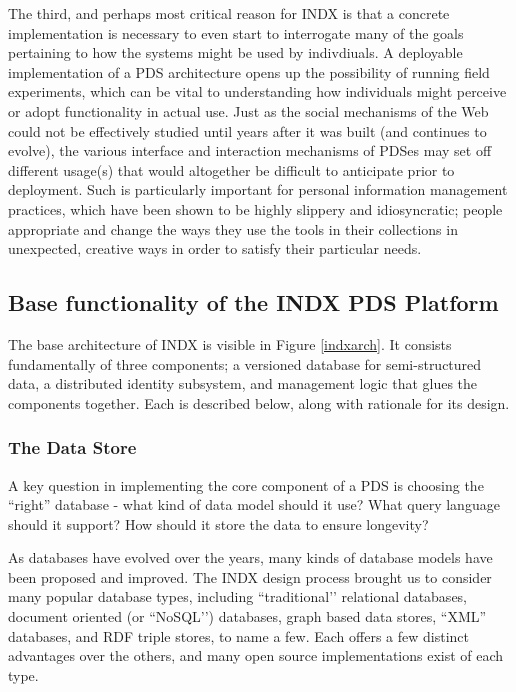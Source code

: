 \documentclass[runningheads,a4paper]{llncs}
\begin{document}
The third, and perhaps most critical reason for INDX is that a concrete implementation is necessary to even start to interrogate many of the goals pertaining to how the systems might be used by indivdiuals.  A deployable implementation of a PDS architecture opens up the possibility of running field experiments, which can be vital to understanding how individuals might perceive or adopt functionality in actual use.  Just as the social mechanisms of the Web could not be effectively studied until years after it was built (and continues to evolve), the various interface and interaction mechanisms of PDSes may set off different usage(s) that would altogether be difficult to anticipate prior to deployment.   Such is particularly important for personal information management practices, which have been shown to be highly slippery and idiosyncratic; people appropriate and change the ways they use the tools in their collections in unexpected, creative ways in order to satisfy their particular needs.

\subsection{Base functionality of the INDX PDS Platform}

The base architecture of INDX is visible in Figure \ref{indxarch}.  It consists fundamentally of three components; a versioned database for semi-structured data, a distributed identity subsystem, and management logic that glues the components together.   Each is described below, along with rationale for its design.

\subsubsection{The Data Store}
A key question in implementing the core component of a PDS is choosing the “right” database - what kind of data model should it use? What query language should it support? How should it store the data to ensure longevity? 

As databases have evolved over the years, many kinds of database models have been proposed and improved.  The INDX design process brought us to consider many popular database types, including ``traditional’’ relational databases, document oriented (or ``NoSQL’’) databases, graph based data stores, “XML” databases, and RDF triple stores, to name a few.  Each offers a few distinct advantages over the others, and many open source implementations exist of each type.
\end{document}
